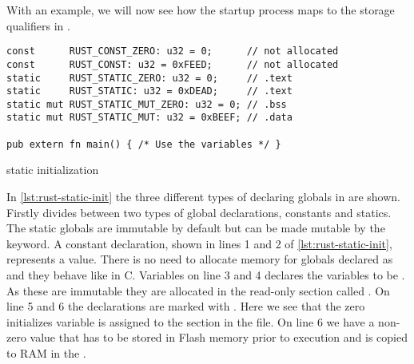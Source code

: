 With an example, we will now see how the startup process maps to the storage qualifiers in \rust.
\begin{listing}[H]
\begin{verbatim}
const      RUST_CONST_ZERO: u32 = 0;      // not allocated
const      RUST_CONST: u32 = 0xFEED;      // not allocated
static     RUST_STATIC_ZERO: u32 = 0;     // .text
static     RUST_STATIC: u32 = 0xDEAD;     // .text
static mut RUST_STATIC_MUT_ZERO: u32 = 0; // .bss
static mut RUST_STATIC_MUT: u32 = 0xBEEF; // .data

pub extern fn main() { /* Use the variables */ }
\end{verbatim}
\caption{\rust static initialization}
\label{lst:rust-static-init}
\end{listing}
In \autoref{lst:rust-static-init} the three different types of declaring globals in \rust are shown.
Firstly \rust divides between two types of global declarations, constants and statics.
The static globals are immutable by default but can be made mutable by the  keyword.
A constant declaration, shown in lines 1 and 2 of \autoref{lst:rust-static-init}, represents a value.
There is no need to allocate memory for globals declared as  and they behave like  in C. 
Variables on line 3 and 4 declares the variables to be .
As these are immutable they are allocated in the read-only section called .
On line 5 and 6 the declarations are marked with .
Here we see that the zero initializes variable is assigned to the  section in the \elf file.
On line 6 we have a non-zero value that has to be stored in Flash memory prior to execution and is copied to RAM in the .

